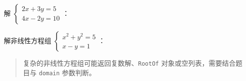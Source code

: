 解 \(\begin{cases} 2x+3y=5 \\ 4x-2y=10\end{cases}\)：

\begin{Shaded}
\begin{Highlighting}[]
\OperatorTok{=}\NormalTok{)}
\OperatorTok{=}\NormalTok{ [}\OperatorTok{*}\OperatorTok{+} \OperatorTok{*}\OperatorTok{{-}} \NormalTok{, }\OperatorTok{*}\OperatorTok{{-}} \OperatorTok{*}\OperatorTok{{-}} \NormalTok{]}
\end{Highlighting}
\end{Shaded}

\begin{Shaded}
\begin{Highlighting}[]
\end{Highlighting}
\end{Shaded}

解非线性方程组 \(\begin{cases} x^2+y^2=5 \\ x-y=1\end{cases}\)：

\begin{Shaded}
\begin{Highlighting}[]
\OperatorTok{=}\NormalTok{)}
\OperatorTok{=}\NormalTok{ [x}\OperatorTok{**} \OperatorTok{+}\OperatorTok{**} \OperatorTok{{-}} \OperatorTok{{-}}\OperatorTok{{-}} \NormalTok{]}
\end{Highlighting}
\end{Shaded}

\begin{Shaded}
\begin{Highlighting}[]
\NormalTok{[({-}1, {-}2), (2, 1)]}
\end{Highlighting}
\end{Shaded}

\begin{quote}
复杂的非线性方程组可能返回复数解、\texttt{RootOf}
对象或空列表，需要结合题目与 \texttt{domain} 参数判断。
\end{quote}

